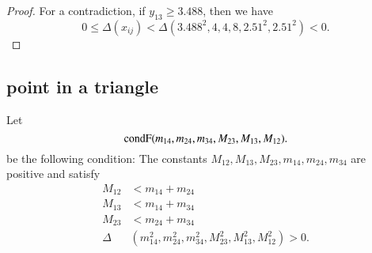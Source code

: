 \begin{tarskidata}
\begin{tarski}
\begin{proof}
For a contradiction, if $y_{13}\ge 3.488$, then
we have
    $$0\le \Delta(x_{ij}) < \Delta(3.488^2,4,4,8,2.51^2,2.51^2)<0.$$
\end{proof}
\end{tarski}






%




\begin{tarski}
\subsection{point in a triangle}

\begin{definition}[$\op{condF}$]
Let
	$$
	{\operatorname{condF}}(m_{14},m_{24},m_{34},M_{23},M_{13},M_{12}).
	$$
be the following condition:
The constants $M_{12},M_{13},M_{23},m_{14},m_{24},m_{34}$ are positive and
satisfy 
	$$
	\begin{array}{rll}
		M_{12} &< m_{14} + m_{24}\\
		M_{13} &< m_{14} + m_{34}\\
		M_{23} &< m_{24} + m_{34}\\
		\Delta&(m_{14}^2,m_{24}^2,m_{34}^2,M_{23}^2,M_{13}^2,M_{12}^2) > 0.\\
	\end{array}
	$$
\end{definition}
\end{tarski}



\begin{tarski}


\end{tarski}
\end{tarskidata}
